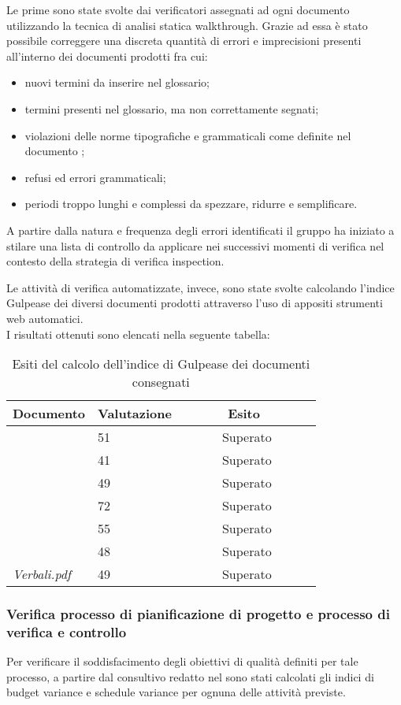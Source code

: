 		Le prime sono state svolte dai verificatori assegnati ad ogni documento utilizzando la tecnica di 					analisi statica walkthrough. Grazie ad essa è stato possibile correggere una discreta quantità di errori e imprecisioni presenti all'interno dei documenti prodotti fra cui: 
		\begin{itemize}	
			\item nuovi termini da inserire nel glossario;
			\item termini presenti nel glossario, ma non correttamente segnati;
			\item violazioni delle norme tipografiche e grammaticali come definite nel documento \NdP;
			\item refusi ed errori grammaticali;
			\item periodi troppo lunghi e complessi da spezzare, ridurre e semplificare.
		\end{itemize}
		A partire dalla natura e frequenza degli errori identificati il gruppo ha iniziato a stilare una lista
		di controllo da applicare nei successivi momenti di verifica nel contesto della strategia di verifica
		inspection.

		Le attività di verifica automatizzate, invece, sono state svolte calcolando l'indice Gulpease dei 	
		diversi documenti prodotti attraverso l'uso di appositi strumenti web automatici. 
		\\I risultati ottenuti sono elencati nella seguente tabella:
		\begin{table}[H]
		\begin{tabular}{|l|l|l|}
		\hline
		\textbf{Documento} 		&\textbf{Valutazione} &\textbf{~~~~~~Esito~~~~~~} \\
		\hline
		\PdQ 					&51		&~~~~~~Superato~~~~~~\\
		\NdP 					&41		&~~~~~~Superato~~~~~~\\
		\SdF 					&49		&~~~~~~Superato~~~~~~\\	
		\AdR 					&72		&~~~~~~Superato~~~~~~\\
		\PdP 					&55		&~~~~~~Superato~~~~~~\\
		\Glossario 				&48		&~~~~~~Superato~~~~~~\\
		\textit{Verbali.pdf} 		&49		&~~~~~~Superato~~~~~~\\
		\hline
		\end{tabular}
		\caption{Esiti del calcolo dell'indice di Gulpease dei documenti consegnati}
		\end{table}
		
		\subsubsection{Verifica processo di pianificazione di progetto e processo di verifica e controllo}
		Per verificare il soddisfacimento degli obiettivi di qualità definiti per tale processo, a partire dal 				consultivo redatto nel \PdP{} sono stati calcolati gli indici di budget variance e schedule variance per ognuna delle attività previste.
		

